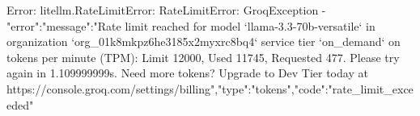 Error: litellm.RateLimitError: RateLimitError: GroqException - {"error":{"message":"Rate limit reached for model `llama-3.3-70b-versatile` in organization `org_01k8mkpz6he3185x2myxrc8bq4` service tier `on_demand` on tokens per minute (TPM): Limit 12000, Used 11745, Requested 477. Please try again in 1.109999999s. Need more tokens? Upgrade to Dev Tier today at https://console.groq.com/settings/billing","type":"tokens","code":"rate_limit_exceeded"}}
